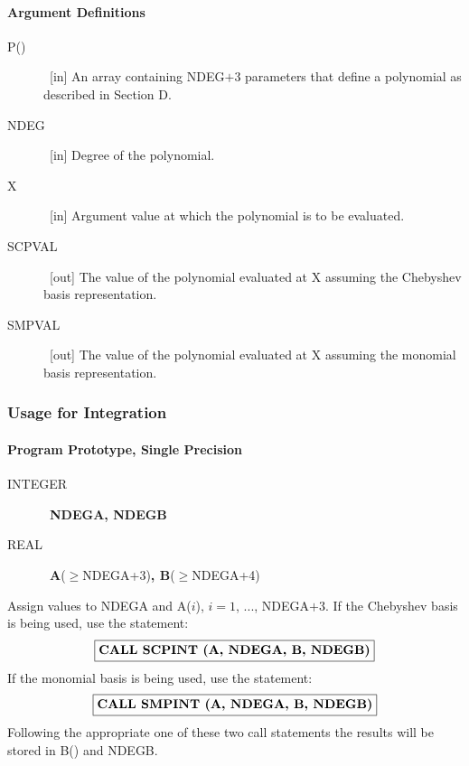 \documentclass[twoside]{MATH77}
\begin{document}
\paragraph{Argument Definitions}
\begin{description}
\item[P()]  \ [in] An array containing NDEG$+3$ parameters that define a
polynomial as described in Section D.

\item[NDEG]  \ [in] Degree of the polynomial.

\item[X]  \ [in] Argument value at which the polynomial is to be evaluated.

\item[SCPVAL]  \ [out] The value of the polynomial evaluated at X assuming
the Chebyshev basis representation.

\item[SMPVAL]  \ [out] The value of the polynomial evaluated at X assuming
the monomial basis representation.
\end{description}
\subsubsection{Usage for Integration}

\paragraph{Program Prototype, Single Precision}
\begin{description}
\item[INTEGER]  \ {\bf NDEGA, NDEGB}

\item[REAL]  \ {\bf A}($\geq $NDEGA+3){\bf , B}($\geq $NDEGA+4)
\end{description}
Assign values to NDEGA and A($i$), $i = 1$, ..., NDEGA$+3$. If the Chebyshev
basis is being used, use the statement:
$$
\fbox{{\bf CALL SCPINT (A, NDEGA, B, NDEGB)}}
$$
If the monomial basis is being used, use the statement:
$$
\fbox{{\bf CALL SMPINT (A, NDEGA, B, NDEGB)}}
$$
Following the appropriate one of these two call statements the results will
be stored in B() and NDEGB.
\end{document}
